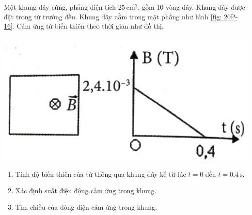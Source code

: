 \begin{ex}
	Một khung dây cứng, phẳng diện tích $\SI{25}{\centi\meter^2}$, gồm 10 vòng dây. Khung dây được đặt trong từ trường đều. Khung dây nằm trong mặt phẳng như hình \ref{fig: 20P-16}. Cảm ứng từ biến thiên theo thời gian như đồ thị.
	\begin{center}
		\includegraphics[width=0.4\linewidth]{figs/VN12-Y24-PH-SYL-020P-16}
		\label{fig: 20P-16}
	\end{center}
	\begin{enumerate}[label=\alph*)]
		\item Tính độ biến thiên của từ thông qua khung dây kể từ lúc $t=0$ đến $t=\SI{0.4}{\second}$.
		\item Xác định suất điện động cảm ứng trong khung.
		\item Tìm chiều của dòng điện cảm ứng trong khung.
	\end{enumerate}
\end{ex}
